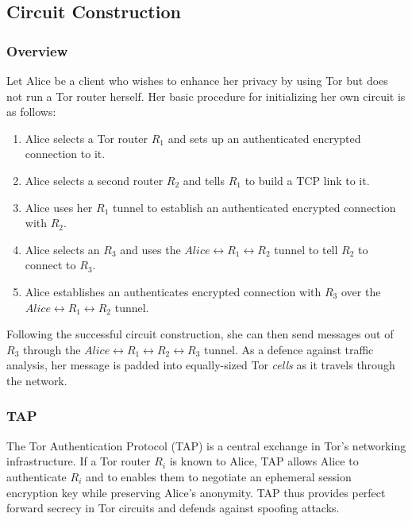 \subsection{Circuit Construction}

\subsubsection{Overview}

Let Alice be a client who wishes to enhance her privacy by using Tor but does not run a Tor router herself. Her basic procedure for initializing her own circuit is as follows:

\begin{enumerate}
	\item Alice selects a Tor router $ R_{1} $ and sets up an authenticated encrypted connection to it.
	\item Alice selects a second router $ R_{2} $ and tells $ R_{1} $ to build a TCP link to it. 
	\item Alice uses her $ R_{1} $ tunnel to establish an authenticated encrypted connection with $ R_{2} $.
	\item Alice selects an $ R_{3} $ and uses the $ Alice \leftrightarrow R_{1} \leftrightarrow R_{2} $ tunnel to tell $ R_{2} $ to connect to $ R_{3} $.
	\item Alice establishes an authenticates encrypted connection with $ R_{3} $ over the \\ $ Alice \leftrightarrow R_{1} \leftrightarrow R_{2} $ tunnel.
\end{enumerate}

Following the successful circuit construction, she can then send messages out of $ R_{3} $ through the $ Alice \leftrightarrow R_{1} \leftrightarrow R_{2} \leftrightarrow R_{3} $ tunnel. As a defence against traffic analysis, her message is padded into equally-sized Tor \emph{cells} as it travels through the network.\cite{mccoy2008shining}

\subsubsection{TAP}

The Tor Authentication Protocol (TAP) is a central exchange in Tor's networking infrastructure. If a Tor router $ R_{i} $ is known to Alice, TAP allows Alice to authenticate $ R_{i} $ and to enables them to negotiate an ephemeral session encryption key while preserving Alice's anonymity. TAP thus provides perfect forward secrecy in Tor circuits and defends against spoofing attacks.

